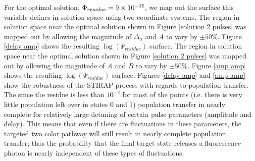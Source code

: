 
For the optimal solution, $\Phi_{residue}=9\times10^{-15}$, we map out the surface this variable defines in solution space using two coordinate systems.
The region in solution space near the optimal solution shown in Figure \ref{solution 2 pulses} was mapped out by allowing the magnitude of $\Delta_{\alpha}$ and $A$ to vary by $\pm 50\%$. Figure \ref{delay amp} shows the resulting $\log(\Psi_{residue})$ surface.
The region in solution space near the optimal solution shown in Figure \ref{solution 2 pulses} was mapped out by allowing the magnitude of $A$ and $B$ to vary by $\pm 50\%$. Figure \ref{amp amp} shows the resulting $\log(\Psi_{residue})$ surface. Figures \ref{delay amp} and \ref{amp amp} show the robustness of the STIRAP process with regards to population transfer. The since the residue is less than $10^{-2}$ for most of the points (i.e. there is very little population left over in states 0 and 1) population transfer in nearly complete for relatively large detuning of certain pulse parameters (amplitude and delay). This means that even if there are fluctuations in these parameters, the targeted two color pathway will still result in nearly complete population transfer; thus the probability that the final target state releases a fluorescence photon is nearly independent of these types of fluctuations.


